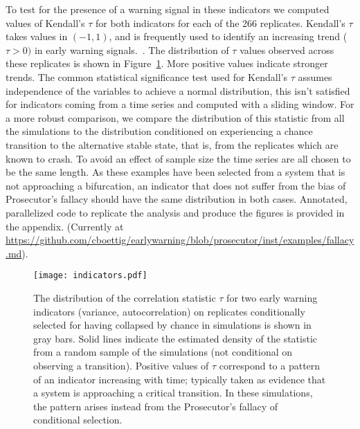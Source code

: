\documentclass[authoryear,review,12pt]{elsarticle}
\begin{document}
To test for the presence of a warning signal in these indicators we
computed values of Kendall's $\tau$ for both indicators for each of
the 266 replicates.  Kendall's $\tau$ takes values in $(-1, 1)$, and is
frequently used to identify an increasing trend ($\tau > 0 )$ in early
warning signals.~\citep{Dakos2008, Dakos2011}.  The distribution
of $\tau$ values observed across these replicates is shown in
Figure~\ref{fig:indicator}.  More positive values indicate stronger
trends. The common statistical significance test used for Kendall's $\tau$
assumes independence of the variables to achieve a normal distribution,
this isn't satisfied for indicators coming from a time series and
computed with a sliding window.  For a more robust comparison, we
compare the distribution of this statistic from all the simulations to
the distribution conditioned on experiencing a chance transition to the
alternative stable state, that is, from the replicates which are known
to crash.  To avoid an effect of sample size the time series are all chosen
to be the same length.  As these examples have been selected from a system
that is not approaching a bifurcation, an indicator that does not suffer
from the bias of Prosecutor's fallacy should have the same distribution
in both cases.   Annotated, parallelized code to replicate the analysis
and produce the figures is provided in the appendix.  (Currently at
\href{https://github.com/cboettig/earlywarning/blob/prosecutor/inst/examples/fallacy.md}{https://github.com/cboettig/earlywarning/blob/prosecutor/inst/examples/fallacy.md}).


\begin{figure}
  \begin{center}
    \texttt{[image: indicators.pdf]}
  \end{center}
  \caption{The distribution of the correlation statistic $\tau$ for two
  early warning indicators (variance, autocorrelation) on replicates
  conditionally selected for having collapsed by chance in simulations
  is shown in gray bars.  Solid lines indicate the estimated density of
  the statistic from a random sample of the simulations (not conditional
  on observing a transition). Positive values of $\tau$ correspond to
  a pattern of an indicator increasing with time; typically taken as
  evidence that a system is approaching a critical transition.  In these
  simulations, the pattern arises instead from the Prosecutor's fallacy
  of conditional selection.}
  \label{fig:indicator}
\end{figure}
\end{document}
